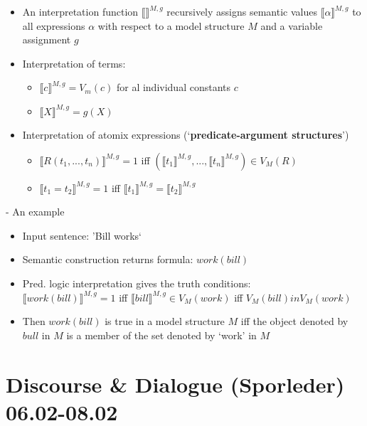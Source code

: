 \documentclass[11pt]{article}
\begin{document}
\begin{itemize}
 \item An interpretation function $\llbracket\rrbracket ^{M,g}$ recursively assigns semantic values $\llbracket\alpha\rrbracket^{M,g}$ to all expressions $\alpha$ with respect to a model structure $M$ and a variable assignment $g$
 \item Interpretation of terms:
\begin{itemize}
 \item $\llbracket c\rrbracket^{M,g} = V_m (c)$ for al individual constants $c$
 \item $\llbracket X\rrbracket^{M,g} = g(X)$
\end{itemize}
 \item Interpretation of atomix expressions (`{\bf predicate-argument structures}')
\begin{itemize}
 \item $\llbracket R(t_1 , ..., t_n)\rrbracket^{M,g} = 1$ iff $(\llbracket t_1\rrbracket^{M,g}, ...,\llbracket t_n\rrbracket^{M,g}) \in V_M (R)$ %
 \item $\llbracket t_1 = t_2\rrbracket^{M,g} = 1$ iff $\llbracket t_1\rrbracket^{M,g} = \llbracket t_2\rrbracket^{M,g}$
\end{itemize}
\end{itemize}
- An example
\begin{itemize}
 \item Input sentence: 'Bill works`
 \item Semantic construction returns formula: $work(bill)$
 \item Pred. logic interpretation gives the truth conditions: \\$\llbracket work(bill)\rrbracket^{M,g} = 1$ iff $\llbracket bill\rrbracket^{M,g} \in V_M (work)$ iff $V_M (bill) in V_M(work)$
 \item Then $work(bill)$ is true in a model structure $M$ iff the object denoted by $bull$ in $M$ is a member of the set denoted by `work' in $M$
\end{itemize}

\section{Discourse \& Dialogue (Sporleder) 06.02-08.02}
\end{document}
